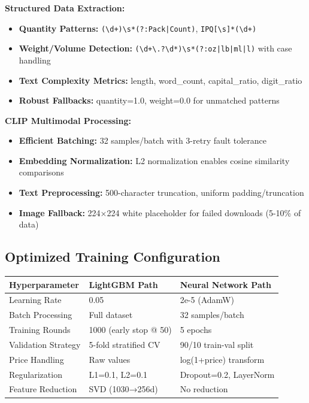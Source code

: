 \documentclass[10pt,a4paper]{article}
\begin{document}
\textbf{Structured Data Extraction:}
\begin{itemize}[itemsep=0.1em]
    \item \textbf{Quantity Patterns:} \texttt{(\textbackslash d+)\textbackslash s*(?:Pack|Count)}, \texttt{IPQ[\textbackslash s]*(\textbackslash d+)}
    \item \textbf{Weight/Volume Detection:} \texttt{(\textbackslash d+\textbackslash.?\textbackslash d*)\textbackslash s*(?:oz|lb|ml|l)} with case handling
    \item \textbf{Text Complexity Metrics:} length, word\_count, capital\_ratio, digit\_ratio
    \item \textbf{Robust Fallbacks:} quantity=1.0, weight=0.0 for unmatched patterns
\end{itemize}

\textbf{CLIP Multimodal Processing:}
\begin{itemize}[itemsep=0.1em]
    \item \textbf{Efficient Batching:} 32 samples/batch with 3-retry fault tolerance
    \item \textbf{Embedding Normalization:} L2 normalization enables cosine similarity comparisons
    \item \textbf{Text Preprocessing:} 500-character truncation, uniform padding/truncation
    \item \textbf{Image Fallback:} 224×224 white placeholder for failed downloads (5-10\% of data)
\end{itemize}

\subsection{Optimized Training Configuration}

\begin{center}
\begin{tabular}{lll}
\toprule
\textbf{Hyperparameter} & \textbf{LightGBM Path} & \textbf{Neural Network Path} \\
\midrule
Learning Rate & 0.05 & 2e-5 (AdamW) \\
Batch Processing & Full dataset & 32 samples/batch \\
Training Rounds & 1000 (early stop @ 50) & 5 epochs \\
Validation Strategy & 5-fold stratified CV & 90/10 train-val split \\
Price Handling & Raw values & log(1+price) transform \\
Regularization & L1=0.1, L2=0.1 & Dropout=0.2, LayerNorm \\
Feature Reduction & SVD (1030→256d) & No reduction \\
\bottomrule
\end{tabular}
\end{center}
\end{document}
